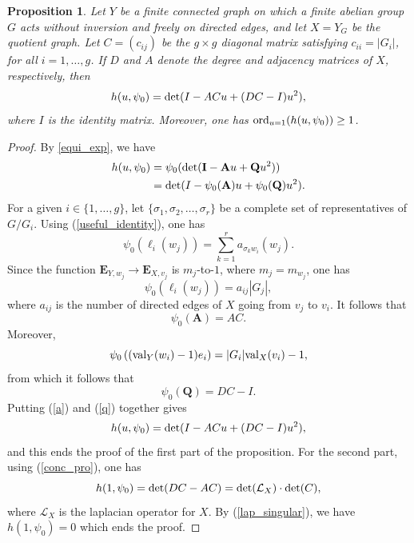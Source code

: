 \documentclass[11pt]{amsart}
\newtheorem{proposition}[theorem]{Proposition}
\numberwithin{equation}{section}
\theoremstyle{remark}
\theoremstyle{definition}
\begin{document}
\begin{proposition} \label{order_of_van}
Let $Y$ be a finite connected graph on which a finite abelian group $G$ acts without inversion and freely on directed edges, and let $X = Y_{G}$ be the quotient graph.  Let $C = (c_{ij})$ be the $g \times g$ diagonal matrix satisfying $c_{ii} = |G_{i}|$, for all $i =1,\ldots,g$.  If $D$ and $A$ denote the degree and adjacency matrices of $X$, respectively, then
$$h(u,\psi_{0}) = {\rm det}(I - ACu + (DC - I)u^{2}), $$
where $I$ is the identity matrix.  Moreover, one has ${\rm ord}_{u=1}(h(u,\psi_{0})) \ge 1$.
\end{proposition}
\begin{proof}
By \cref{equi_exp}, we have
\begin{equation*}
\begin{aligned}
h(u,\psi_{0}) &= \psi_{0}({\rm det}(\mathbf{I} - \mathbf{A}u + \mathbf{Q}u^{2})) \\
&= {\rm det}(I - \psi_{0}(\mathbf{A})u + \psi_{0}(\mathbf{Q})u^{2}).
\end{aligned}
\end{equation*}
For a given $i \in \{1,\dots,g \}$, let $\{\sigma_{1},\sigma_{2},\ldots,\sigma_{r} \}$ be a complete set of representatives of $G/G_{i}$.  Using (\ref{useful_identity}), one has
$$\psi_{0}(\ell_{i}(w_{j})) = \sum_{k=1}^{r}a_{\sigma_{k}w_{i}}(w_{j}). $$ 
Since the function $\mathbf{E}_{Y,w_{j}} \rightarrow \mathbf{E}_{X,v_{j}}$ is $m_{j}$-to-$1$, where $m_{j} = m_{w_{j}}$, one has
$$\psi_{0}(\ell_{i}(w_{j})) = a_{ij} |G_{j}|, $$
where $a_{ij}$ is the number of directed edges of $X$ going from $v_{j}$ to $v_{i}$.  It follows that
\begin{equation} \label{a}
\psi_{0}(\mathbf{A}) = AC. 
\end{equation}
Moreover,
$$\psi_{0}\left(({\rm val}_{Y}(w_{i}) - 1)e_{i} \right) = |G_{i}|{\rm val}_{X}(v_{i}) -1, $$
from which it follows that
\begin{equation} \label{q}
\psi_{0}(\mathbf{Q}) = DC - I. 
\end{equation}
Putting (\ref{a}) and (\ref{q}) together gives
\begin{equation} \label{conc_pro}
h(u,\psi_{0}) =  {\rm det}(I - ACu + (DC - I)u^{2}),
\end{equation}
and this ends the proof of the first part of the proposition.  For the second part, using (\ref{conc_pro}), one has
$$h(1,\psi_{0}) = {\rm det}(DC - AC) = {\rm det}(\mathcal{L}_{X}) \cdot {\rm det}(C), $$
where $\mathcal{L}_{X}$ is the laplacian operator for $X$.  By (\ref{lap_singular}), we have $h(1,\psi_{0}) = 0$ which ends the proof.
\end{proof}
\end{document}
